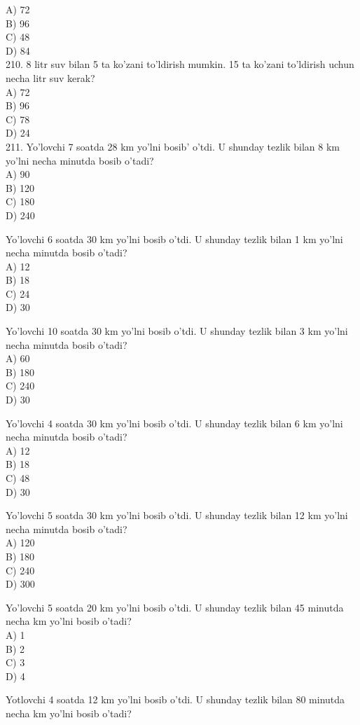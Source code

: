 A) 72\\
B) 96\\
C) 48\\
D) 84\\
210. 8 litr suv bilan 5 ta ko'zani to'ldirish mumkin. 15 ta ko'zani to'ldirish uchun necha litr suv kerak?\\
A) 72\\
B) 96\\
C) 78\\
D) 24\\
211. Yo'lovchi 7 soatda 28 km yo'lni bosib' o'tdi. U shunday tezlik bilan 8 km yo'lni necha minutda bosib o'tadi?\\
A) 90\\
B) 120\\
C) 180\\
D) 240
  \item Yo'lovchi 6 soatda 30 km yo'lni bosib o'tdi. U shunday tezlik bilan 1 km yo'lni necha minutda bosib o'tadi?\\
A) 12\\
B) 18\\
C) 24\\
D) 30
  \item Yo'lovchi 10 soatda 30 km yo'lni bosib o'tdi. U shunday tezlik bilan 3 km yo'lni necha minutda bosib o'tadi?\\
A) 60\\
B) 180\\
C) 240\\
D) 30
  \item Yo'lovchi 4 soatda 30 km yo'lni bosib o'tdi. U shunday tezlik bilan 6 km yo'lni necha minutda bosib o'tadi?\\
A) 12\\
B) 18\\
C) 48\\
D) 30
  \item Yo'lovchi 5 soatda 30 km yo'lni bosib o'tdi. U shunday tezlik bilan 12 km yo'lni necha minutda bosib o'tadi?\\
A) 120\\
B) 180\\
C) 240\\
D) 300
  \item Yo'lovchi 5 soatda 20 km yo'lni bosib o'tdi. U shunday tezlik bilan 45 minutda necha km yo'lni bosib o'tadi?\\
A) 1\\
B) 2\\
C) 3\\
D) 4
  \item Yotlovchi 4 soatda 12 km yo'lni bosib o'tdi. U shunday tezlik bilan 80 minutda necha km yo'lni bosib o'tadi?\\
